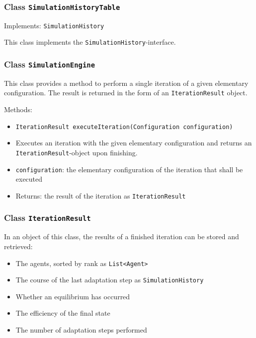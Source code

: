 \documentclass[parskip=full,11pt]{scrartcl}
\begin{document}
\subsubsection{Class \texttt{SimulationHistoryTable}}
Implements: \texttt{SimulationHistory}

This  class implements the \texttt{SimulationHistory}-interface.

\subsubsection{Class \texttt{SimulationEngine}}
This class provides a method to perform a single iteration of a given elementary configuration. The result is returned in the form of an \texttt{IterationResult} object.

Methods:
\begin{itemize}\itemsep -10pt
\item \texttt{IterationResult executeIteration(Configuration configuration)}
\item[] Executes an iteration with the given elementary configuration and returns an \texttt{IterationResult}-object upon finishing.
\item[] \texttt{configuration}: the elementary configuration of the iteration that shall be executed
\item[] Returns: the result of the iteration as \texttt{IterationResult}
\end{itemize}

\subsubsection{Class \texttt{IterationResult}}
In an object of this class, the results of a finished iteration can be stored and retrieved:
\begin{itemize}\itemsep -10pt
\item The agents, sorted by rank as \texttt{List<Agent>}
\item The course of the last adaptation step as \texttt{SimulationHistory}
\item Whether an equilibrium has occurred
\item The efficiency of the final state
\item The number of adaptation steps performed
\end{itemize}
\end{document}
